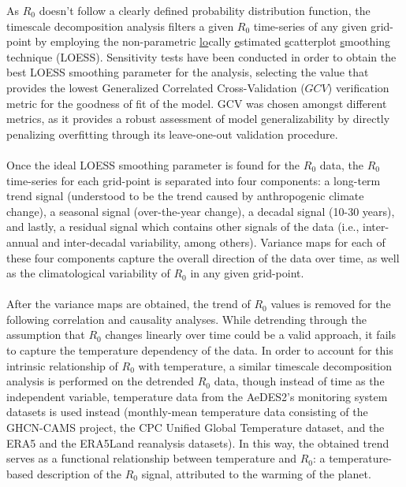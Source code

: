 \documentclass[10pt,twocolumn]{wlscirep}
\begin{document}
As $R_0$ doesn't follow a clearly defined probability distribution function, the timescale decomposition analysis filters a given $R_0$ time-series of any given grid-point by employing the non-parametric \underline{lo}cally \underline{e}stimated \underline{s}catterplot \underline{s}moothing technique (LOESS)\cite{jacoby_2000}. Sensitivity tests have been conducted in order to obtain the best LOESS smoothing parameter for the analysis, selecting the value that provides the lowest Generalized Correlated Cross-Validation ($GCV$) verification metric for the goodness of fit of the model\cite{craven_1978}. GCV was chosen amongst different metrics, as it provides a robust assessment of model generalizability by directly penalizing overfitting through its leave-one-out validation procedure\cite{marcotte_1995}.
\\
\\
Once the ideal LOESS smoothing parameter is found for the $R_0$ data, the $R_0$ time-series for each grid-point is separated into four components: a long-term trend signal (understood to be the trend caused by anthropogenic climate change), a seasonal signal (over-the-year change), a decadal signal (10-30 years), and lastly, a residual signal which contains other signals of the data (i.e., inter-annual and inter-decadal variability, among others). Variance maps for each of these four components capture the overall direction of the data over time, as well as the climatological variability of $R_0$ in any given grid-point.
\\
\\
After the variance maps are obtained, the trend of $R_0$ values is removed for the following correlation and causality analyses. While detrending through the assumption that $R_0$ changes linearly over time could be a valid approach, it fails to capture the temperature dependency of the data. In order to account for this intrinsic relationship of $R_0$ with temperature, a similar timescale decomposition analysis is performed on the detrended $R_0$ data, though instead of time as the independent variable, temperature data from the AeDES2's monitoring system datasets is used instead (monthly-mean temperature data consisting of the GHCN-CAMS project\cite{fan_2008}, the CPC Unified Global Temperature dataset\cite{xie_2007}, and the ERA5 and the ERA5Land reanalysis datasets\cite{chen_2008}). In this way, the obtained trend serves as a functional relationship between temperature and $R_0$: a temperature-based description of the $R_0$ signal, attributed to the warming of the planet\cite{greene_2011}.
\end{document}
